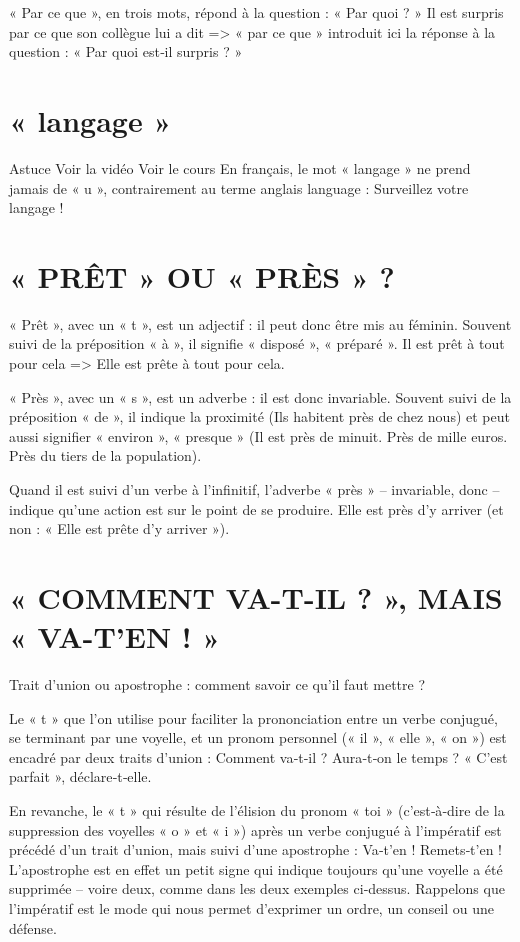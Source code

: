 « Par ce que », en trois mots, répond à la question : « Par quoi ? »
Il est surpris par ce que son collègue lui a dit => « par ce que » introduit ici la réponse à la question : « Par quoi est‑il surpris ? »

\section{« langage »}

Astuce Voir la vidéo Voir le cours
En français, le mot « langage » ne prend jamais de « u », contrairement au terme anglais language : Surveillez votre langage !

\section{« PRÊT » OU « PRÈS » ?}

« Prêt », avec un « t », est un adjectif : il peut donc être mis au féminin.
Souvent suivi de la préposition « à », il signifie « disposé », « préparé ».
Il est prêt à tout pour cela => Elle est prête à tout pour cela.

« Près », avec un « s », est un adverbe : il est donc invariable.
Souvent suivi de la préposition « de », il indique la proximité (Ils habitent près de chez nous) et peut aussi signifier « environ », « presque » (Il est près de minuit. Près de mille euros. Près du tiers de la population).

Quand il est suivi d'un verbe à l'infinitif, l'adverbe « près » – invariable, donc – indique qu'une action est sur le point de se produire.
Elle est près d'y arriver (et non : « Elle est prête d'y arriver »).

\section{« COMMENT VA-T-IL ? », MAIS « VA-T'EN ! »}

Trait d'union ou apostrophe : comment savoir ce qu'il faut mettre ?

Le « t » que l'on utilise pour faciliter la prononciation entre un verbe conjugué, se terminant par une voyelle, et un pronom personnel (« il », « elle », « on ») est encadré par deux traits d'union : Comment va‑t‑il ? Aura‑t‑on le temps ? « C'est parfait », déclare‑t‑elle.

En revanche, le « t » qui résulte de l'élision du pronom « toi » (c'est‑à‑dire de la suppression des voyelles « o » et « i ») après un verbe conjugué à l'impératif est précédé d'un trait d'union, mais suivi d'une apostrophe : Va‑t'en ! Remets‑t'en !
L'apostrophe est en effet un petit signe qui indique toujours qu'une voyelle a été supprimée – voire deux, comme dans les deux exemples ci‑dessus.
Rappelons que l'impératif est le mode qui nous permet d'exprimer un ordre, un conseil ou une défense.

